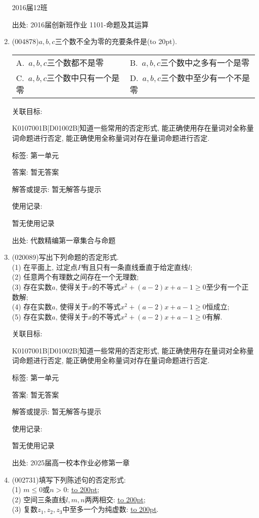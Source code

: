 \documentclass[10pt,a4paper]{article}
\newcommand{\blank}[1]{\underline{\hbox to #1pt{}}}
\newcommand{\bracket}[1]{(\hbox to #1pt{})}
\newcommand{\twoch}[4]{\par\begin{tabular}{p{.46\textwidth}p{.46\textwidth}}
A.~#1& B.~#2\\
C.~#3& D.~#4
\end{tabular}}
\begin{document}
\begin{enumerate}[1.]
2016届12班				


出处: 2016届创新班作业	1101-命题及其运算
\item { (004878)}$a,b,c$三个数不全为零的充要条件是\bracket{20}.
\twoch{$a,b,c$三个数都不是零}{$a,b,c$三个数中之多有一个是零}{$a,b,c$三个数中只有一个是零}{$a,b,c$三个数中至少有一个不是零}


关联目标:

K0107001B|D01002B|知道一些常用的否定形式, 能正确使用存在量词对全称量词命题进行否定, 能正确使用全称量词对存在量词命题进行否定.



标签: 第一单元

答案: 暂无答案

解答或提示: 暂无解答与提示

使用记录:

暂无使用记录


出处: 代数精编第一章集合与命题
\item { (020089)}写出下列命题的否定形式.\\
(1) 在平面上, 过定点$P$有且只有一条直线垂直于给定直线$l$;\\
(2) 任意两个有理数之间存在一个无理数;\\
(3) 存在实数$a$, 使得关于$x$的不等式$x^2+(a-2)x+a-1\ge 0$至少有一个正数解;\\
(4) 存在实数$a$, 使得关于$x$的不等式$x^2+(a-2)x+a-1\ge 0$恒成立;\\
(5) 存在实数$a$, 使得关于$x$的不等式$x^2+(a-2)x+a-1\ge 0$有解.


关联目标:

K0107001B|D01002B|知道一些常用的否定形式, 能正确使用存在量词对全称量词命题进行否定, 能正确使用全称量词对存在量词命题进行否定.



标签: 第一单元

答案: 暂无答案

解答或提示: 暂无解答与提示

使用记录:

暂无使用记录


出处: 2025届高一校本作业必修第一章
\item { (002731)}填写下列陈述句的否定形式:\\
(1) $m\le 0$或$n>0$: \blank{200};\\
(2) 空间三条直线$l,m,n$两两相交: \blank{200};\\
(3) 复数$z_1,z_2,z_3$中至多一个为纯虚数: \blank{200}.



\end{enumerate}
\end{document}
